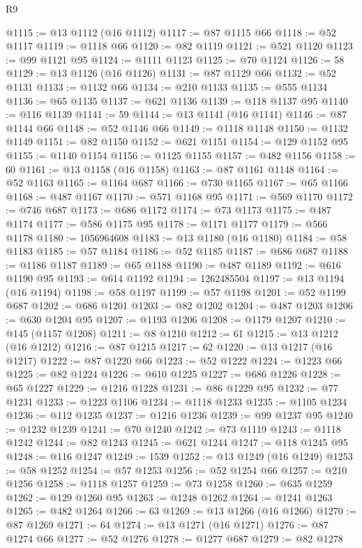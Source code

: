 \begin{lexlean}{R9}
\begin{coremodule}
@1115 := @13 @1112 (@16 @1112)
@1117 := @87 @1115 @66
@1118 := @52 @1117
@1119 := @1118 @66
@1120 := @82 @1119
@1121 := @521 @1120
@1123 := @99 @1121 @95
@1124 := @1111 @1123
@1125 := @70 @1124
@1126 := 58
@1129 := @13 @1126 (@16 @1126)
@1131 := @87 @1129 @66
@1132 := @52 @1131
@1133 := @1132 @66
@1134 := @210 @1133
@1135 := @555 @1134
@1136 := @65 @1135
@1137 := @621 @1136
@1139 := @118 @1137 @95
@1140 := @116 @1139
@1141 := 59
@1144 := @13 @1141 (@16 @1141)
@1146 := @87 @1144 @66
@1148 := @52 @1146 @66
@1149 := @1118 @1148
@1150 := @1132 @1149
@1151 := @82 @1150
@1152 := @621 @1151
@1154 := @129 @1152 @95
@1155 := @1140 @1154
@1156 := @1125 @1155
@1157 := @482 @1156
@1158 := 60
@1161 := @13 @1158 (@16 @1158)
@1163 := @87 @1161 @1148
@1164 := @52 @1163
@1165 := @1164 @687
@1166 := @730 @1165
@1167 := @65 @1166
@1168 := @487 @1167
@1170 := @571 @1168 @95
@1171 := @569 @1170
@1172 := @746 @687
@1173 := @686 @1172
@1174 := @73 @1173
@1175 := @487 @1174
@1177 := @586 @1175 @95
@1178 := @1171 @1177
@1179 := @566 @1178
@1180 := 1056964608
@1183 := @13 @1180 (@16 @1180)
@1184 := @58 @1183
@1185 := @57 @1184
@1186 := @52 @1185
@1187 := @686 @687
@1188 := @1186 @1187
@1189 := @65 @1188
@1190 := @487 @1189
@1192 := @616 @1190 @95
@1193 := @614 @1192
@1194 := 1262485504
@1197 := @13 @1194 (@16 @1194)
@1198 := @58 @1197
@1199 := @57 @1198
@1201 := @52 @1199 @687
@1202 := @686 @1201
@1203 := @82 @1202
@1204 := @487 @1203
@1206 := @630 @1204 @95
@1207 := @1193 @1206
@1208 := @1179 @1207
@1210 := @145 (@1157 @1208)
@1211 := @8 @1210
@1212 := 61
@1215 := @13 @1212 (@16 @1212)
@1216 := @87 @1215
@1217 := 62
@1220 := @13 @1217 (@16 @1217)
@1222 := @87 @1220 @66
@1223 := @52 @1222
@1224 := @1223 @66
@1225 := @82 @1224
@1226 := @610 @1225
@1227 := @686 @1226
@1228 := @65 @1227
@1229 := @1216 @1228
@1231 := @86 @1229 @95
@1232 := @77 @1231
@1233 := @1223 @1106
@1234 := @1118 @1233
@1235 := @1105 @1234
@1236 := @112 @1235
@1237 := @1216 @1236
@1239 := @99 @1237 @95
@1240 := @1232 @1239
@1241 := @70 @1240
@1242 := @73 @1119
@1243 := @1118 @1242
@1244 := @82 @1243
@1245 := @621 @1244
@1247 := @118 @1245 @95
@1248 := @116 @1247
@1249 := 1539
@1252 := @13 @1249 (@16 @1249)
@1253 := @58 @1252
@1254 := @57 @1253
@1256 := @52 @1254 @66
@1257 := @210 @1256
@1258 := @1118 @1257
@1259 := @73 @1258
@1260 := @635 @1259
@1262 := @129 @1260 @95
@1263 := @1248 @1262
@1264 := @1241 @1263
@1265 := @482 @1264
@1266 := 63
@1269 := @13 @1266 (@16 @1266)
@1270 := @87 @1269
@1271 := 64
@1274 := @13 @1271 (@16 @1271)
@1276 := @87 @1274 @66
@1277 := @52 @1276
@1278 := @1277 @687
@1279 := @82 @1278

\end{coremodule}
\end{lexlean}
